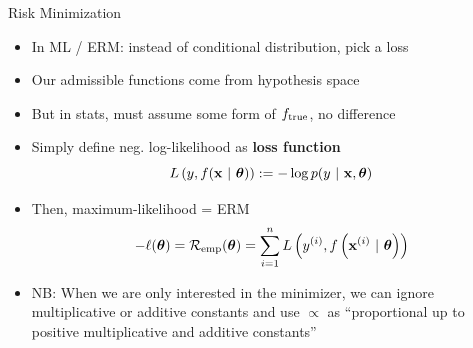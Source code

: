\documentclass[11pt,compress,t,notes=noshow, xcolor=table]{beamer}
\begin{document}
\begin{vbframe}{Risk Minimization} 

\begin{itemize}
\item In ML / ERM: instead of conditional distribution, pick a loss 
\item Our admissible functions come from hypothesis space 
\item But in stats, must assume some form of $f_{\text{true}}$, no difference

\item Simply define neg. log-likelihood as \textbf{loss function} 
$$ L\left(y, f(\mathbf{x} ~|~ \bm{\theta})\right) := - \log p(y ~|~\mathbf{x}, \bm{\theta}) $$
\item Then, maximum-likelihood 
 = ERM
$$- \ell(\bm{\theta}) = \mathcal{R}_{\text{emp}}(\bm{\theta}) = \sum\limits_{i=1}^n L\left(y^{(i)}, f\left(\mathbf{x}^{(i)} ~|~ \bm{\theta}\right)\right)$$

\item NB: When we are only interested in the minimizer, we can ignore multiplicative or additive constants and use $\propto$ as \enquote{proportional up to positive multiplicative and additive constants}

\end{itemize}

\end{vbframe}
\end{document}
